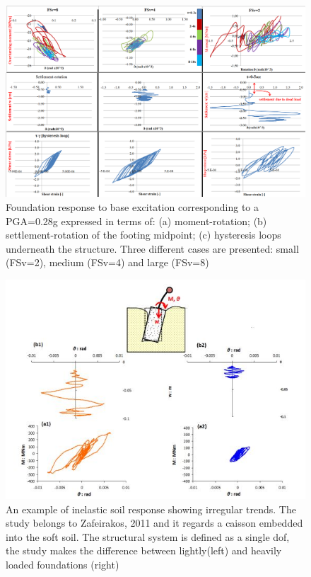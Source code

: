  \begin{figure}[!h]
 	\centering
 	\includegraphics[width=1\linewidth]{"fs2,4,8"}
 	\caption{Foundation response to base excitation corresponding to a PGA=0.28g expressed in terms of: (a) moment-rotation; (b) settlement-rotation of the footing midpoint; (c) hysteresis loops underneath the structure. Three different cases are presented: small (FSv=2), medium (FSv=4) and large (FSv=8)}
 	\label{eq2}
 \end{figure}

 \begin{figure}[!h]
 	\centering
 	\includegraphics[width=0.9\linewidth]{"irregular"}
 	\caption{An example of inelastic soil response showing irregular trends. The study belongs to Zafeirakos, 2011 \cite{zafeirakos2011role} and it regards a caisson embedded into the soft soil. The structural system is defined as a single dof, the study makes the difference between lightly(left) and heavily loaded foundations (right)}
 	\label{eq5}
 \end{figure}

